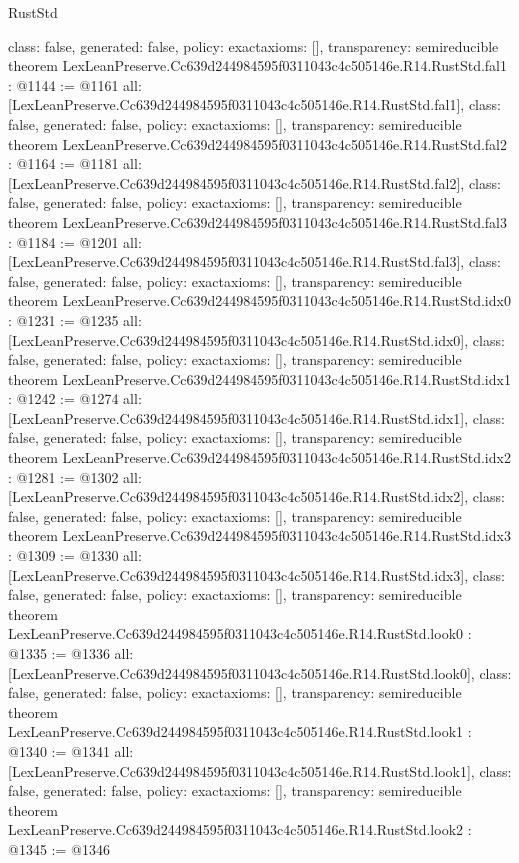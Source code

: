 \begin{lexlean}{RustStd}
\begin{coremodule}
{  class: false,
  generated: false,
  policy: exact{axioms: []},
  transparency: semireducible
}
theorem LexLeanPreserve.Cc639d244984595f0311043c4c505146e.R14.RustStd.fal1 : @1144 := @1161 {
  all: [LexLeanPreserve.Cc639d244984595f0311043c4c505146e.R14.RustStd.fal1],
  class: false,
  generated: false,
  policy: exact{axioms: []},
  transparency: semireducible
}
theorem LexLeanPreserve.Cc639d244984595f0311043c4c505146e.R14.RustStd.fal2 : @1164 := @1181 {
  all: [LexLeanPreserve.Cc639d244984595f0311043c4c505146e.R14.RustStd.fal2],
  class: false,
  generated: false,
  policy: exact{axioms: []},
  transparency: semireducible
}
theorem LexLeanPreserve.Cc639d244984595f0311043c4c505146e.R14.RustStd.fal3 : @1184 := @1201 {
  all: [LexLeanPreserve.Cc639d244984595f0311043c4c505146e.R14.RustStd.fal3],
  class: false,
  generated: false,
  policy: exact{axioms: []},
  transparency: semireducible
}
theorem LexLeanPreserve.Cc639d244984595f0311043c4c505146e.R14.RustStd.idx0 : @1231 := @1235 {
  all: [LexLeanPreserve.Cc639d244984595f0311043c4c505146e.R14.RustStd.idx0],
  class: false,
  generated: false,
  policy: exact{axioms: []},
  transparency: semireducible
}
theorem LexLeanPreserve.Cc639d244984595f0311043c4c505146e.R14.RustStd.idx1 : @1242 := @1274 {
  all: [LexLeanPreserve.Cc639d244984595f0311043c4c505146e.R14.RustStd.idx1],
  class: false,
  generated: false,
  policy: exact{axioms: []},
  transparency: semireducible
}
theorem LexLeanPreserve.Cc639d244984595f0311043c4c505146e.R14.RustStd.idx2 : @1281 := @1302 {
  all: [LexLeanPreserve.Cc639d244984595f0311043c4c505146e.R14.RustStd.idx2],
  class: false,
  generated: false,
  policy: exact{axioms: []},
  transparency: semireducible
}
theorem LexLeanPreserve.Cc639d244984595f0311043c4c505146e.R14.RustStd.idx3 : @1309 := @1330 {
  all: [LexLeanPreserve.Cc639d244984595f0311043c4c505146e.R14.RustStd.idx3],
  class: false,
  generated: false,
  policy: exact{axioms: []},
  transparency: semireducible
}
theorem LexLeanPreserve.Cc639d244984595f0311043c4c505146e.R14.RustStd.look0 : @1335 := @1336 {
  all: [LexLeanPreserve.Cc639d244984595f0311043c4c505146e.R14.RustStd.look0],
  class: false,
  generated: false,
  policy: exact{axioms: []},
  transparency: semireducible
}
theorem LexLeanPreserve.Cc639d244984595f0311043c4c505146e.R14.RustStd.look1 : @1340 := @1341 {
  all: [LexLeanPreserve.Cc639d244984595f0311043c4c505146e.R14.RustStd.look1],
  class: false,
  generated: false,
  policy: exact{axioms: []},
  transparency: semireducible
}
theorem LexLeanPreserve.Cc639d244984595f0311043c4c505146e.R14.RustStd.look2 : @1345 := @1346 {
}
\end{coremodule}
\end{lexlean}
